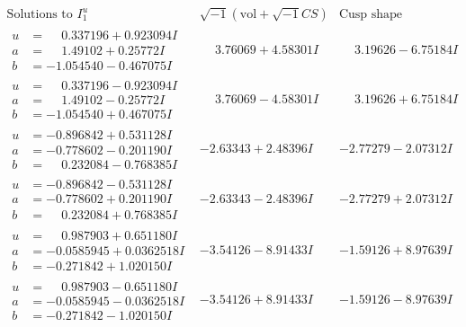 \documentclass[1p]{elsarticle_modified}
\theoremstyle{definition}
\newcommand{\I}{\sqrt{-1}}
\begin{document}
$$\begin{array}{c|c|c}  
\text{Solutions to }I^u_{1}& \I (\text{vol} + \sqrt{-1}CS) & \text{Cusp shape}\\
 \hline 
\begin{aligned}
u &= \phantom{-}0.337196 + 0.923094 I \\
a &= \phantom{-}1.49102 + 0.25772 I \\
b &= -1.054540 - 0.467075 I\end{aligned}
 & \phantom{-}3.76069 + 4.58301 I & \phantom{-}3.19626 - 6.75184 I \\ \hline\begin{aligned}
u &= \phantom{-}0.337196 - 0.923094 I \\
a &= \phantom{-}1.49102 - 0.25772 I \\
b &= -1.054540 + 0.467075 I\end{aligned}
 & \phantom{-}3.76069 - 4.58301 I & \phantom{-}3.19626 + 6.75184 I \\ \hline\begin{aligned}
u &= -0.896842 + 0.531128 I \\
a &= -0.778602 - 0.201190 I \\
b &= \phantom{-}0.232084 - 0.768385 I\end{aligned}
 & -2.63343 + 2.48396 I & -2.77279 - 2.07312 I \\ \hline\begin{aligned}
u &= -0.896842 - 0.531128 I \\
a &= -0.778602 + 0.201190 I \\
b &= \phantom{-}0.232084 + 0.768385 I\end{aligned}
 & -2.63343 - 2.48396 I & -2.77279 + 2.07312 I \\ \hline\begin{aligned}
u &= \phantom{-}0.987903 + 0.651180 I \\
a &= -0.0585945 + 0.0362518 I \\
b &= -0.271842 + 1.020150 I\end{aligned}
 & -3.54126 - 8.91433 I & -1.59126 + 8.97639 I \\ \hline\begin{aligned}
u &= \phantom{-}0.987903 - 0.651180 I \\
a &= -0.0585945 - 0.0362518 I \\
b &= -0.271842 - 1.020150 I\end{aligned}
 & -3.54126 + 8.91433 I & -1.59126 - 8.97639 I \\ \hline\begin{aligned}

\end{aligned}
\end{array}$$
\end{document}
